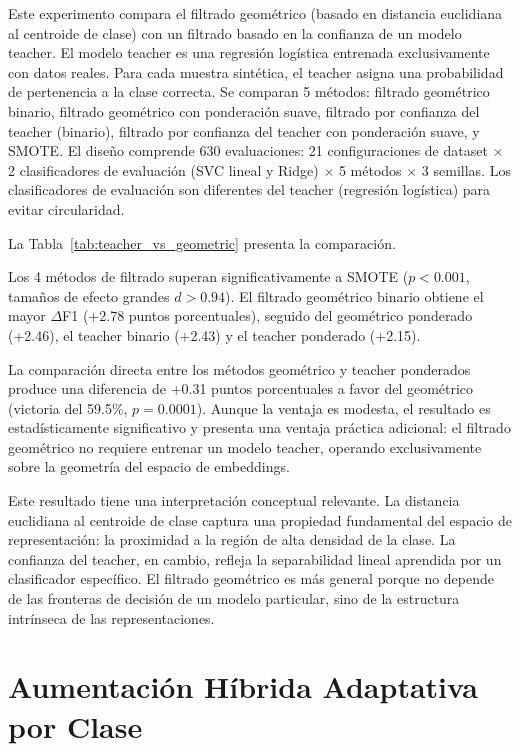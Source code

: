 Este experimento compara el filtrado geométrico (basado en distancia euclidiana al centroide de clase) con un filtrado basado en la confianza de un modelo teacher. El modelo teacher es una regresión logística entrenada exclusivamente con datos reales. Para cada muestra sintética, el teacher asigna una probabilidad de pertenencia a la clase correcta. Se comparan 5 métodos: filtrado geométrico binario, filtrado geométrico con ponderación suave, filtrado por confianza del teacher (binario), filtrado por confianza del teacher con ponderación suave, y SMOTE. El diseño comprende 630 evaluaciones: 21 configuraciones de dataset $\times$ 2 clasificadores de evaluación (SVC lineal y Ridge) $\times$ 5 métodos $\times$ 3 semillas. Los clasificadores de evaluación son diferentes del teacher (regresión logística) para evitar circularidad.

La Tabla~\ref{tab:teacher_vs_geometric} presenta la comparación.



Los 4 métodos de filtrado superan significativamente a SMOTE ($p < 0.001$, tamaños de efecto grandes $d > 0.94$). El filtrado geométrico binario obtiene el mayor $\Delta$F1 (+2.78 puntos porcentuales), seguido del geométrico ponderado (+2.46), el teacher binario (+2.43) y el teacher ponderado (+2.15).

La comparación directa entre los métodos geométrico y teacher ponderados produce una diferencia de +0.31 puntos porcentuales a favor del geométrico (victoria del 59.5\%, $p = 0.0001$). Aunque la ventaja es modesta, el resultado es estadísticamente significativo y presenta una ventaja práctica adicional: el filtrado geométrico no requiere entrenar un modelo teacher, operando exclusivamente sobre la geometría del espacio de embeddings.

Este resultado tiene una interpretación conceptual relevante. La distancia euclidiana al centroide de clase captura una propiedad fundamental del espacio de representación: la proximidad a la región de alta densidad de la clase. La confianza del teacher, en cambio, refleja la separabilidad lineal aprendida por un clasificador específico. El filtrado geométrico es más general porque no depende de las fronteras de decisión de un modelo particular, sino de la estructura intrínseca de las representaciones.

\section{Aumentación Híbrida Adaptativa por Clase}
\label{sec:hybrid_adaptive}

